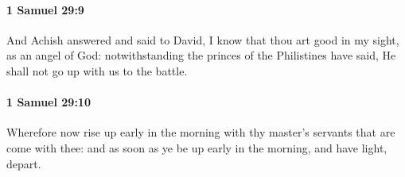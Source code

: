 		\paragraph{1 Samuel 29:9} %
			\label{1SAMUEL-29-9}

			And Achish answered and said to David, I know that thou art good in my sight, as an angel of God: notwithstanding the princes of the Philistines have said, He shall not go up with us to the battle.


		\paragraph{1 Samuel 29:10} %
			\label{1SAMUEL-29-10}

			Wherefore now rise up early in the morning with thy master’s servants that are come with thee: and as soon as ye be up early in the morning, and have light, depart.


